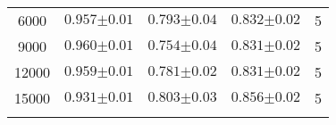 \begin{table}[H]
\begin{subtable}{\textwidth}
\begin{tabularx}{\textwidth}{cYYYY}
6000 & $0.957{\scriptscriptstyle\pm0.01}$ & $0.793{\scriptscriptstyle\pm0.04}$ & $0.832{\scriptscriptstyle\pm0.02}$ & 5 \\
9000 & $0.960{\scriptscriptstyle\pm0.01}$ & $0.754{\scriptscriptstyle\pm0.04}$ & $0.831{\scriptscriptstyle\pm0.02}$ & 5 \\
12000 & $0.959{\scriptscriptstyle\pm0.01}$ & $0.781{\scriptscriptstyle\pm0.02}$ & $0.831{\scriptscriptstyle\pm0.02}$ & 5 \\
15000 & $0.931{\scriptscriptstyle\pm0.01}$ & $0.803{\scriptscriptstyle\pm0.03}$ & $0.856{\scriptscriptstyle\pm0.02}$ & 5 \\
         \\
    \end{tabularx}
    \end{subtable}
\end{table}
